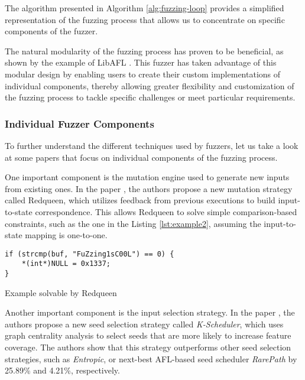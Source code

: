 The algorithm presented in Algorithm \ref{alg:fuzzing-loop} provides a simplified representation of the fuzzing process that allows us to concentrate on specific components of the fuzzer.

The natural modularity of the fuzzing process has proven to be beneficial, as shown by the example of LibAFL \cite{libafl-ccs21}. This fuzzer has taken advantage of this modular design by enabling users to create their custom implementations of individual components, thereby allowing greater flexibility and customization of the fuzzing process to tackle specific challenges or meet particular requirements.

\subsubsection{Individual Fuzzer Components}

To further understand the different techniques used by fuzzers, let us take a look at some papers that focus on individual components of the fuzzing process.

One important component is the mutation engine used to generate new inputs from existing ones. In the paper \cite{redqueen-ndss19}, the authors propose a new mutation strategy called Redqueen, which utilizes feedback from previous executions to build input-to-state correspondence. This allows Redqueen to solve simple comparison-based constraints, such as the one in the Listing \ref{lst:example2}, assuming the input-to-state mapping is one-to-one.

\begin{listing}[htp]
	\centering
	\begin{minipage}{.6\linewidth}
		\begin{verbatim}
if (strcmp(buf, "FuZzing1sC00L") == 0) {
	*(int*)NULL = 0x1337;
}
		\end{verbatim}
	\end{minipage}
	\caption{Example solvable by Redqueen}
	\label{lst:example2}
\end{listing}

Another important component is the input selection strategy. In the paper \cite{effective-seed-scheduling-for-fuzzing-with-graph-centrality-analysis}, the authors propose a new seed selection strategy called \textit{K-Scheduler}, which uses graph centrality analysis to select seeds that are more likely to increase feature coverage. The authors show that this strategy outperforms other seed selection strategies, such as \textit{Entropic}, or next-best AFL-based seed scheduler \textit{RarePath} by 25.89\% and 4.21\%, respectively.

